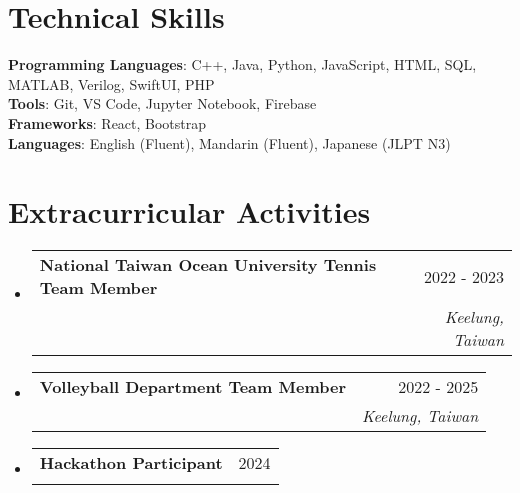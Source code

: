 \documentclass[letterpaper,11pt]{article}
\makeatletter
\newcommand{\resumeSubheading}[4]{
  \vspace{-2pt}\item
    \begin{tabular*}{0.97\textwidth}[t]{l@{\extracolsep{\fill}}r}
      \textbf{#1} & #2 \\
      \textit{\small#3} & \textit{\small #4} \\
    \end{tabular*}\vspace{-7pt}
}
\newcommand{\resumeSubHeadingListStart}{\begin{itemize}[leftmargin=0.15in, label={}]}
\newcommand{\resumeSubHeadingListEnd}{\end{itemize}}
\makeatother
\begin{document}
\section{Technical Skills}
 \begin{itemize}[leftmargin=0.15in, label={}]
    \small{\item{
     \textbf{Programming Languages}{: C++, Java, Python, JavaScript, HTML, SQL, MATLAB, Verilog, SwiftUI, PHP} \\
     \textbf{Tools}{: Git, VS Code, Jupyter Notebook, Firebase} \\
     \textbf{Frameworks}{: React, Bootstrap} \\
     \textbf{Languages}{: English (Fluent), Mandarin (Fluent), Japanese (JLPT N3)}
    }}
 \end{itemize}

\section{Extracurricular Activities}
    \resumeSubHeadingListStart
      \resumeSubheading
        {National Taiwan Ocean University Tennis Team Member}{2022 - 2023}{}{Keelung, Taiwan} %
      \resumeSubheading
        {Volleyball Department Team Member}{2022 - 2025}{}{Keelung, Taiwan} %
      \resumeSubheading
        {Hackathon Participant}{2024}{}{} 

    \resumeSubHeadingListEnd

\end{document}

